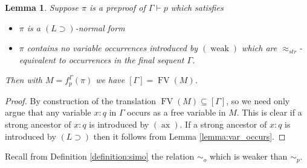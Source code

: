 \documentclass[english,letter paper,12pt,leqno]{article}
\newtheorem{lemma}[theorem]{Lemma}
\theoremstyle{example}
\numberwithin{equation}{section}
\def\imp{\supset}
\begin{document}
\begin{lemma}\label{lemma:yeehoo} Suppose $\pi$ is a preproof of $\Gamma \vdash p$ which satisfies
\begin{itemize}
\item $\pi$ is a $(L \imp)$-normal form
\item $\pi$ contains no variable occurrences introduced by $(\operatorname{weak})$ which are $\approx_{str}$-equivalent to occurrences in the final sequent $\Gamma$.
\end{itemize}
Then with $M = f^\Gamma_p(\pi)$ we have $[ \Gamma ] = \operatorname{FV}(M)$.
\end{lemma}
\begin{proof}
By construction of the translation $\operatorname{FV}(M) \subseteq [ \Gamma ]$, so we need only argue that any variable $x:q$ in $\Gamma$ occurs as a free variable in $M$. This is clear if a strong ancestor of $x:q$ is introduced by $(\operatorname{ax})$. If a strong ancestor of $x:q$ is introduced by $(L \imp)$ then it follows from Lemma \ref{lemma:var_occurs}.
\end{proof}

Recall from Definition \ref{definition:simo} the relation $\sim_o$ which is weaker than $\sim_p$.
\end{document}
